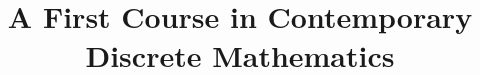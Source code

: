 \documentclass{maatext}
\theoremstyle{definition}
\theoremstyle{remark}
\numberwithin{section}{chapter}
\numberwithin{equation}{chapter}
\begin{document}
\frontmatter

\title{A First Course in Contemporary Discrete Mathematics}


\author{}

\author{}

\maketitle


\setcounter{page}{5}

\tableofcontents

%
%

\mainmatter





\appendix
%

\backmatter



\end{document}

